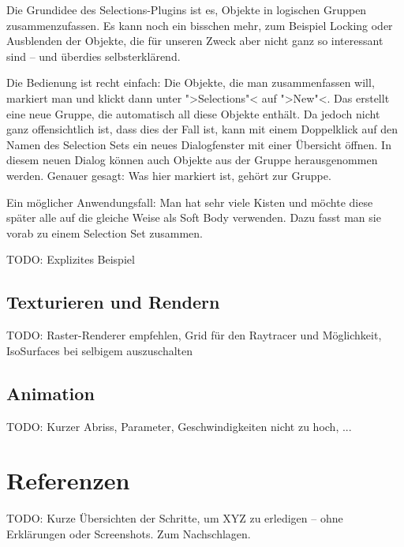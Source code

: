 \documentclass[10pt,DIV=14,a4paper]{scrartcl}
\begin{document}
Die Grundidee des Selections-Plugins ist es, Objekte in logischen
Gruppen zusammenzufassen. Es kann noch ein bisschen mehr, zum Beispiel
Locking oder Ausblenden der Objekte, die für unseren Zweck aber nicht
ganz so interessant sind -- und überdies selbst\-er\-klä\-rend.

Die Bedienung ist recht einfach: Die Objekte, die man zusammenfassen
will, markiert man und klickt dann unter ">Selections"< auf ">New"<. Das
erstellt eine neue Gruppe, die automatisch all diese Objekte enthält. Da
jedoch nicht ganz offensichtlich ist, dass dies der Fall ist, kann mit
einem Doppelklick auf den Namen des Selection Sets ein neues
Dialogfenster mit einer Übersicht öffnen. In diesem neuen Dialog können
auch Objekte aus der Gruppe herausgenommen werden. Genauer gesagt: Was
hier markiert ist, gehört zur Gruppe.

Ein möglicher Anwendungsfall: Man hat sehr viele Kisten und möchte diese
später alle auf die gleiche Weise als Soft Body verwenden. Dazu fasst
man sie vorab zu einem Selection Set zusammen.

TODO: Explizites Beispiel

\subsection{Texturieren und Rendern}
TODO: Raster-Renderer empfehlen, Grid für den Raytracer und Möglichkeit,
IsoSurfaces bei selbigem auszuschalten

\subsection{Animation}
TODO: Kurzer Abriss, Parameter, Geschwindigkeiten nicht zu hoch, ...



\pagebreak
\section{Referenzen}
TODO: Kurze Übersichten der Schritte, um XYZ zu erledigen -- ohne
Erklärungen oder Screenshots. Zum Nachschlagen.
\end{document}
